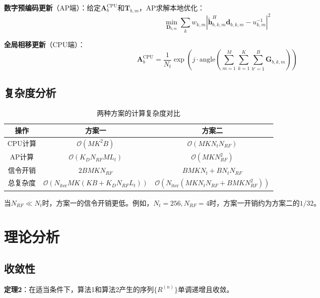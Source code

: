 \documentclass[10pt,twocolumn]{IEEEtran}
\newcommand{\vect}[1]{\mathbf{#1}}
\newcommand{\mat}[1]{\mathbf{#1}}
\begin{document}
\textbf{数字预编码更新}（AP端）：给定$\mat{A}_b^{\text{CPU}}$和$\mat{T}_{b,m}$，AP求解本地优化：
\begin{equation}
\min_{\mat{D}_{b,m}} \sum_{k} w_{k,m} \left|\tilde{\vect{h}}_{b,k,m}^H \vect{d}_{b,k,m} - u_{k,m}^{-1}\right|^2
\end{equation}

\textbf{全局相移更新}（CPU端）：
\begin{equation}
\mat{A}_b^{\text{CPU}} = \frac{1}{N_t} \exp\left(j \cdot \text{angle}\left(\sum_{m=1}^M \sum_{k=1}^K \sum_{b'=1}^B \mat{G}_{b,k,m}\right)\right)
\end{equation}

\subsection{复杂度分析}

\begin{table}[htbp]
\caption{两种方案的计算复杂度对比}
\begin{center}
\begin{tabular}{|c|c|c|}
\hline
\textbf{操作} & \textbf{方案一} & \textbf{方案二} \\
\hline
CPU计算 & $\mathcal{O}(MK^2B)$ & $\mathcal{O}(MKN_t N_{RF})$ \\
\hline
AP计算 & $\mathcal{O}(K_D N_{RF} M L_t)$ & $\mathcal{O}(MK N_{RF}^2)$ \\
\hline
信令开销 & $2BMK N_{RF}$ & $BMK N_t + BN_t N_{RF}$ \\
\hline
总复杂度 & $\mathcal{O}(N_{\text{iter}}MK(KB+K_D N_{RF}L_t))$ & $\mathcal{O}(N_{\text{iter}}(MKN_t N_{RF}+BMK N_{RF}^2))$ \\
\hline
\end{tabular}
\end{center}
\end{table}

当$N_{RF} \ll N_t$时，方案一的信令开销更低。例如，$N_t=256, N_{RF}=4$时，方案一开销约为方案二的$1/32$。

\section{理论分析}

\subsection{收敛性}

\textbf{定理2}：在适当条件下，算法1和算法2产生的序列$\{R^{(n)}\}$单调递增且收敛。
\end{document}
